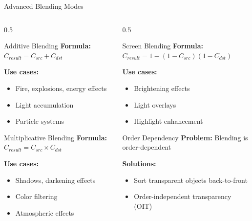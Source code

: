 \begin{frame}{Advanced Blending Modes}
  \footnotesize
  \begin{columns}
    \begin{column}{0.5\textwidth}
      \begin{conceptbox}{Additive Blending}
        \textbf{Formula:} $C_{result} = C_{src} + C_{dst}$

        \textbf{Use cases:}
        \begin{itemize}
          \item Fire, explosions, energy effects
          \item Light accumulation
          \item Particle systems
        \end{itemize}
      \end{conceptbox}

      \begin{conceptbox}{Multiplicative Blending}
        \textbf{Formula:} $C_{result} = C_{src} \times C_{dst}$

        \textbf{Use cases:}
        \begin{itemize}
          \item Shadows, darkening effects
          \item Color filtering
          \item Atmospheric effects
        \end{itemize}
      \end{conceptbox}
    \end{column}
    \begin{column}{0.5\textwidth}
      \begin{conceptbox}{Screen Blending}
        \textbf{Formula:} $C_{result} = 1 - (1 - C_{src})(1 - C_{dst})$

        \textbf{Use cases:}
        \begin{itemize}
          \item Brightening effects
          \item Light overlays
          \item Highlight enhancement
        \end{itemize}
      \end{conceptbox}

      \begin{raybox}{Order Dependency}
        \textbf{Problem:} Blending is order-dependent

        \textbf{Solutions:}
        \begin{itemize}
          \item Sort transparent objects back-to-front
          \item Order-independent transparency (OIT)
        \end{itemize}
      \end{raybox}
    \end{column}
  \end{columns}
\end{frame}

